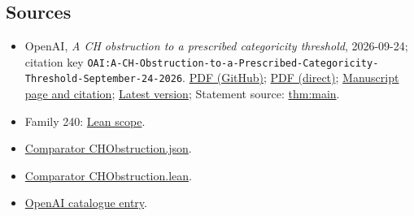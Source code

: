 \documentclass[11pt]{article}
\begin{document}
\subsection{Sources}
\begin{itemize}
\item OpenAI, \emph{A CH obstruction to a prescribed categoricity threshold}, 2026-09-24; citation key \texttt{OAI:A-CH-Obstruction-to-a-Prescribed-Categoricity-Threshold-September-24-2026}. \href{https://github.com/openai/math/blob/adc7f1241b42e322a6451854ab7e4b4c146bf78a/preprints/A-CH-Obstruction-to-a-Prescribed-Categoricity-Threshold-September-24-2026/paper.pdf}{PDF (GitHub)}; \href{https://github.com/openai/math/raw/adc7f1241b42e322a6451854ab7e4b4c146bf78a/preprints/A-CH-Obstruction-to-a-Prescribed-Categoricity-Threshold-September-24-2026/paper.pdf}{PDF (direct)}; \href{https://github.com/openai/math/blob/adc7f1241b42e322a6451854ab7e4b4c146bf78a/preprints/A-CH-Obstruction-to-a-Prescribed-Categoricity-Threshold-September-24-2026/README.md}{Manuscript page and citation}; \href{https://github.com/openai/math/blob/main/preprints/A-CH-Obstruction-to-a-Prescribed-Categoricity-Threshold-September-24-2026/paper.pdf}{Latest version}; Statement source: \href{https://github.com/openai/math/blob/adc7f1241b42e322a6451854ab7e4b4c146bf78a/preprints/A-CH-Obstruction-to-a-Prescribed-Categoricity-Threshold-September-24-2026/build/sections/00-introduction.tex\#L87}{thm:main}.
\item Family 240: \href{https://github.com/openai/math/blob/adc7f1241b42e322a6451854ab7e4b4c146bf78a/lean/docs/240.md}{Lean scope}.
\item \href{https://github.com/openai/math/blob/adc7f1241b42e322a6451854ab7e4b4c146bf78a/lean/ComparatorChallenges/CHObstruction.json}{Comparator CHObstruction.json}.
\item \href{https://github.com/openai/math/blob/adc7f1241b42e322a6451854ab7e4b4c146bf78a/lean/ComparatorChallenges/CHObstruction.lean}{Comparator CHObstruction.lean}.
\item \href{https://github.com/openai/math/blob/adc7f1241b42e322a6451854ab7e4b4c146bf78a/CONTENTS.md}{OpenAI catalogue entry}.
\end{itemize}
\end{document}
